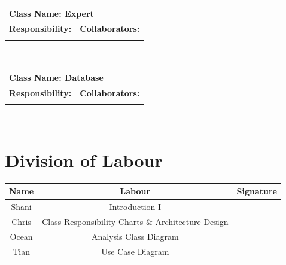 \documentclass[]{article}
\begin{document}
	\begin{table}[ht]
		\centering
		\begin{tabular}{|p{5cm}|p{5cm}|}
		\hline
		 \multicolumn{2}{|l|}{\textbf{Class Name: Expert}} \\
		\hline
		\textbf{Responsibility:} & \textbf{Collaborators:} \\
		\hline
		\vspace{1in} & \\
		\hline
		\end{tabular}
	\end{table}~\\

	\begin{table}[ht]
		\centering
		\begin{tabular}{|p{5cm}|p{5cm}|}
		\hline
		 \multicolumn{2}{|l|}{\textbf{Class Name: Database}} \\
		\hline
		\textbf{Responsibility:} & \textbf{Collaborators:} \\
		\hline
		\vspace{1in} & \\
		\hline
		\end{tabular}
	\end{table}~\\

\appendix
\section{Division of Labour}
\label{sec:division_of_labour}
\begin{center}
\begin{tabular}{ |c|c|c| }
 \hline
 Name & Labour & Signature              \\ \hline
 Shani & Introduction I & \\
 Chris & Class Responsibility Charts \& Architecture Design &  \\
 Ocean & Analysis Class Diagram &  \\
 Tian & Use Case Diagram & \\
 \hline
\end{tabular}
\end{center}

\newpage
\end{document}
